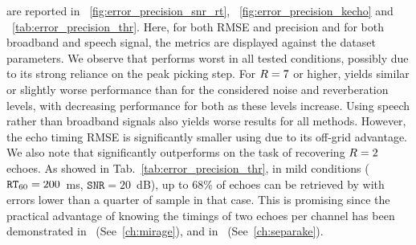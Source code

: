  are reported in ~\cref{fig:error_precision_snr_rt}, ~\cref{fig:error_precision_kecho} and ~\cref{tab:error_precision_thr}.
Here, for both RMSE and precision and for both broadband and speech signal, the metrics are displayed against the dataset parameters.
We observe that \algoBsn{} performs worst in all tested conditions, possibly due to its strong reliance on the peak picking step.
For $R=7$ or higher, \algoBraire{} yields similar or slightly worse performance than \algoCrocco{} for the considered noise and reverberation levels, with decreasing performance for both as these levels increase.
Using speech rather than broadband signals also yields worse results for all methods.
However, the echo timing RMSE is significantly smaller using \algoBraire{} due to its off-grid advantage.
We also note that \algoBraire{} significantly outperforms \algoCrocco{} on the task of recovering $R=2$ echoes.
As showed in Tab.~\ref{tab:error_precision_thr}, in mild conditions ($\mathtt{RT}_{60} = 200$~ms, $\mathtt{SNR} = 20$~dB), up to 68\% of echoes can be retrieved by \algoBraire{} with errors lower than a quarter of sample in that case.
This is promising since the practical advantage of knowing the timings of two echoes per channel has been demonstrated in~ (See~\cref{ch:mirage}), and in~ (See~\cref{ch:separake}).


